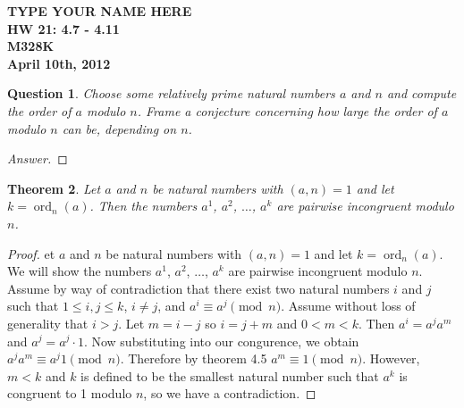 \documentclass[12pt,leqno]{article}
\numberwithin{equation}{section}
\newtheorem{thm}{Theorem}[section]
\newtheorem{ques}[thm]{Question}
\theoremstyle{definition}
\newcommand{\ord}{\operatorname{ord}}
\begin{document}
\thispagestyle{plain}
\begin{flushright}
\large{\textbf{TYPE YOUR NAME HERE \\
HW 21: 4.7 - 4.11\\
M328K \\
April 10th, 2012 \\}}
\end{flushright}

\markboth{}{} \setcounter{section}{0} \baselineskip=18pt

\setcounter{tocdepth}{4}



\setcounter{section}{4}

\setcounter{thm}{6}


\begin{ques}
Choose some relatively prime natural numbers $a$ and $n$ and compute
the order of $a$ modulo $n$. Frame a conjecture concerning how large
the order of $a$ modulo $n$ can be, depending on $n$.
\end{ques}
\begin{proof}[Answer]
\end{proof}


\begin{thm}
Let $a$ and $n$ be natural numbers with $(a, n) = 1$ and let $k =
\ord_n(a)$.  Then the numbers $a^1$, $a^2$, $\dots$, $a^k$ are
pairwise incongruent modulo $n$.
\end{thm}
\begin{proof}[Proof]
et $a$ and $n$ be natural numbers with $(a, n) = 1$ and let $k = \ord_n(a)$.  We will show the numbers $a^1$, $a^2$, $\dots$, $a^k$ are pairwise incongruent modulo $n$.  Assume by way of contradiction that there exist two natural numbers $i$ and $j$ such that $1 \leq i, j \leq k$, $i \neq j$, and $a^i \equiv a^j \pmod{n}$.  Assume without loss of generality that $i > j$.  Let $m = i - j$ so $i = j + m$ and $0 < m < k$.  Then $a^i = a^ja^m$ and $a^j = a^j \cdot 1$.  Now substituting into our congurence, we obtain $a^ja^m \equiv a^j1 \pmod{n}$.  Therefore by theorem 4.5 $a^m \equiv 1 \pmod{n}$.  However, $m < k$ and $k$ is defined to be the smallest natural number such that $a^k$ is congruent to 1 modulo $n$, so we have a contradiction.
\end{proof}
\end{document}
